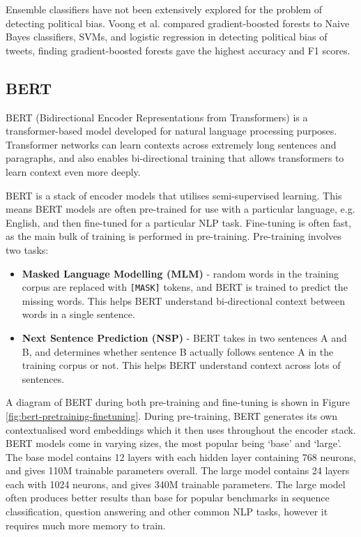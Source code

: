 Ensemble classifiers have not been extensively explored for the problem of detecting political bias. Voong et al. \cite{voong} compared gradient-boosted forests to Naive Bayes classifiers, SVMs, and logistic regression in detecting political bias of tweets, finding gradient-boosted forests gave the highest accuracy and F1 scores.

\subsection{BERT}

BERT (Bidirectional Encoder Representations from Transformers) \cite{bert} is a transformer-based model developed for natural language processing purposes. Transformer networks can learn contexts across extremely long sentences and paragraphs, and also enables bi-directional training that allows transformers to learn context even more deeply.

BERT is a stack of encoder models that utilises semi-supervised learning. This means BERT models are often pre-trained for use with a particular language, e.g. English, and then fine-tuned for a particular NLP task. Fine-tuning is often fast, as the main bulk of training is performed in pre-training. Pre-training involves two tasks:
\begin{itemize}
    \item \textbf{Masked Language Modelling (MLM)} - random words in the training corpus are replaced with \texttt{[MASK]} tokens, and BERT is trained to predict the missing words. This helps BERT understand bi-directional context between words in a single sentence.
    \item \textbf{Next Sentence Prediction (NSP)} - BERT takes in two sentences A and B, and determines whether sentence B actually follows sentence A in the training corpus or not. This helps BERT understand context across lots of sentences.
\end{itemize}

A diagram of BERT during both pre-training and fine-tuning is shown in Figure \ref{fig:bert-pretraining-finetuning}. During pre-training, BERT generates its own contextualised word embeddings which it then uses throughout the encoder stack. BERT models come in varying sizes, the most popular being `base' and `large'. The base model contains 12 layers with each hidden layer containing 768 neurons, and gives 110M trainable parameters overall. The large model contains 24 layers each with 1024 neurons, and gives 340M trainable parameters. The large model often produces better results than base for popular benchmarks in sequence classification, question answering and other common NLP tasks, however it requires much more memory to train.

